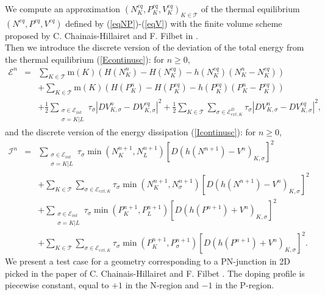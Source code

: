 \documentclass[smallextended]{svjour3}
\begin{document}
We compute an approximation $(N^{eq}_{K},P^{eq}_{K},V^{eq}_{K})_{K \in \mathcal{T}}$ of the thermal equilibrium $(N^{eq},P^{eq},V^{eq})$ defined by (\ref{eqNP})-(\ref{eqV}) with the finite volume scheme proposed by C. Chainais-Hillairet and F. Filbet in \cite{Chainais-Hillairet2007}.\\
Then we introduce the discrete version of the deviation of the total energy from the thermal equilibrium (\ref{Econtinusc}): for $n\geq 0$,
\begin{eqnarray*}
\mathcal{E}^{n} &=& \sum_{K \in \mathcal{T}}\text{m}(K) \left(H(N^{n}_{K})-H(N^{eq}_{K})-h(N^{eq}_{K})\left(N^{n}_{K}-N^{eq}_{K}\right)\right)\\
& & + \sum_{K \in \mathcal{T}}\text{m}(K) \left(H(P^{n}_{K})-H(P^{eq}_{K})-h(P^{eq}_{K})(P^{n}_{K}-P^{eq}_{K})\right)\\
& & + \frac{1}{2}\sum_{\substack{\sigma \in \mathcal{E}_{int} \\ \sigma=K|L}}\tau_{\sigma}\left\vert DV_{K,\sigma}^{n}-DV_{K,\sigma}^{eq} \right\vert^{2}+\frac{1}{2}\sum_{K\in \mathcal{T}}\sum_{\sigma \in \mathcal{E}_{ext,K}^{D}}\tau_{\sigma}\left\vert DV_{K,\sigma}^{n}-DV_{K,\sigma}^{eq} \right\vert^{2},
\end{eqnarray*}
and the discrete version of the energy dissipation (\ref{Icontinusc}): for $n \geq 0$,
\begin{eqnarray*}
\mathcal{I}^{n} &=& \sum_{\substack{\sigma \in \mathcal{E}_{int} \\ \sigma=K|L}}\tau_{\sigma}\min\left(N_{K}^{n+1},N_{L}^{n+1}\right)\left[D\left(h\left(N^{n+1}\right)-V^{n}\right)_{K,\sigma}\right]^{2}\\
& & + \sum_{K \in \mathcal{T}}\sum_{\sigma \in \mathcal{E}_{ext,K}}\tau_{\sigma}\min\left(N_{K}^{n+1},N_{\sigma}^{n+1}\right)\left[D\left(h\left(N^{n+1}\right)-V^{n}\right)_{K,\sigma}\right]^{2}\\
& & + \sum_{\substack{\sigma \in \mathcal{E}_{int} \\ \sigma=K|L}}\tau_{\sigma}\min\left(P_{K}^{n+1},P_{L}^{n+1}\right)\left[D\left(h\left(P^{n+1}\right)+V^{n}\right)_{K,\sigma}\right]^{2}\\
& & + \sum_{K \in \mathcal{T}}\sum_{\sigma \in \mathcal{E}_{ext,K}}\tau_{\sigma}\min\left(P_{K}^{n+1},P_{\sigma}^{n+1}\right)\left[D\left(h\left(P^{n+1}\right)+V^{n}\right)_{K,\sigma}\right]^{2}.
\end{eqnarray*}
We present a test case for a geometry corresponding to a PN-junction in 2D  picked in the paper of C. Chainais-Hillairet and F. Filbet \cite{Chainais-Hillairet2007}. The doping profile is piecewise constant, equal to $+1$ in the N-region and $-1$ in the P-region.\\
\end{document}
